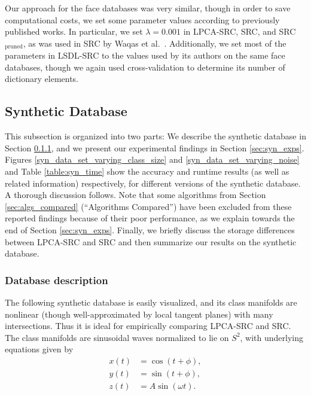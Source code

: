 \documentclass[review]{elsarticle}
\begin{document}
Our approach for the face databases was very similar, though in order to save computational costs, we set some parameter values according to previously published works. In particular, we set $\lambda = 0.001$ in LPCA-SRC, SRC, and SRC$_\mathrm{pruned}$, as was used in SRC by Waqas et al.\ \cite{waq:cnrc}. Additionally, we set most of the parameters in LSDL-SRC to the values used by its authors \cite{wei:lsdl} on the same face databases, though we again used cross-validation to determine its number of dictionary elements.


\subsection{Synthetic Database} 

This subsection is organized into two parts: We describe the synthetic database in Section \ref{sec:syn_descript}, and we present our experimental findings in Section \ref{sec:syn_exps}. Figures \ref{syn_data_set_varying_class_size} and \ref{syn_data_set_varying_noise} and Table \ref{table:syn_time} show the accuracy and runtime results (as well as related information) respectively, for different versions of the synthetic database. A thorough discussion follows. Note that some algorithms from Section \ref{sec:algs_compared} (``Algorithms Compared'') have been excluded from these reported findings because of their poor performance, as we explain towards the end of Section \ref{sec:syn_exps}. Finally, we briefly discuss the storage differences between LPCA-SRC and SRC and then summarize our results on the synthetic database. 

\subsubsection{Database description} \label{sec:syn_descript}

The following synthetic database is easily visualized, and its class manifolds are nonlinear (though well-approximated by local tangent planes) with many intersections. Thus it is ideal for empirically comparing LPCA-SRC and SRC. The class manifolds are sinusoidal waves normalized to lie on $S^2$, with underlying equations given by
\begin{align*}
x(t) &= \cos(t+\phi), \\
y(t) &= \sin(t+\phi), \\
z(t) &= A \sin(\omega t).
\end{align*}
\end{document}
